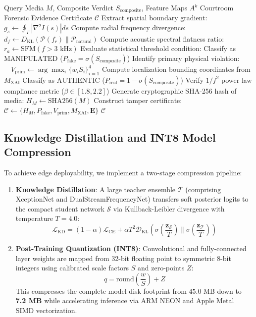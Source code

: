 \documentclass[journal]{IEEEtran}
\begin{document}
\begin{algorithm}[!t]
\caption{Explainable Evidence Attribution and Forensic Proof Generation}
\label{alg:evidence_proof}
\begin{algorithmic}[1]
\REQUIRE Query Media $M$, Composite Verdict $S_{\text{composite}}$, Feature Maps $A^k$
\ENSURE Courtroom Forensic Evidence Certificate $\mathcal{C}$
\STATE Extract spatial boundary gradient: $g_s \leftarrow \oint_\Gamma |\nabla^2 I(s)| ds$
\STATE Compute radial frequency divergence: $d_f \leftarrow D_{\text{KL}}(\mathcal{P}(f_r) \parallel \mathcal{P}_{\text{natural}})$
\STATE Compute acoustic spectral flatness ratio: $r_a \leftarrow \text{SFM}(f > 3\text{ kHz})$
\STATE Evaluate statistical threshold condition:
    \STATE Classify as $\text{MANIPULATED}$ ($P_{\text{fake}} = \sigma(S_{\text{composite}})$)
    \STATE Identify primary physical violation:
    \STATE $\quad V_{\text{prim}} \leftarrow \arg\max_{i} \{w_i S_i\}_{i=1}^4$
    \STATE Compute localization bounding coordinates from $M_{\text{XAI}}$
\ELSE
    \STATE Classify as $\text{AUTHENTIC}$ ($P_{\text{real}} = 1 - \sigma(S_{\text{composite}})$)
    \STATE Verify $1/f^2$ power law compliance metric ($\beta \in [1.8, 2.2]$)
\ENDIF
\STATE Generate cryptographic SHA-256 hash of media: $H_M \leftarrow \text{SHA256}(M)$
\STATE Construct tamper certificate: $\mathcal{C} \leftarrow \{H_M, P_{\text{fake}}, V_{\text{prim}}, M_{\text{XAI}}, \mathbf{E}\}$
\RETURN $\mathcal{C}$
\end{algorithmic}
\end{algorithm}

\subsection{Knowledge Distillation and INT8 Model Compression}
To achieve edge deployability, we implement a two-stage compression pipeline:
\begin{enumerate}
    \item \textbf{Knowledge Distillation}: A large teacher ensemble $\mathcal{T}$ (comprising XceptionNet and DualStreamFrequencyNet) transfers soft posterior logits to the compact student network $\mathcal{S}$ via Kullback-Leibler divergence with temperature $T = 4.0$:
    \begin{equation}
    \mathcal{L}_{\text{KD}} = (1 - \alpha) \mathcal{L}_{\text{CE}} + \alpha T^2 \mathcal{D}_{\text{KL}}\left( \sigma\left(\frac{\mathbf{z}_\mathcal{S}}{T}\right) \parallel \sigma\left(\frac{\mathbf{z}_\mathcal{T}}{T}\right) \right)
    \end{equation}
    \item \textbf{Post-Training Quantization (INT8)}: Convolutional and fully-connected layer weights are mapped from 32-bit floating point to symmetric 8-bit integers using calibrated scale factors $S$ and zero-points $Z$:
    \begin{equation}
    q = \text{round}\left( \frac{w}{S} \right) + Z
    \end{equation}
    This compresses the complete model disk footprint from $45.0\text{ MB}$ down to \textbf{7.2 MB} while accelerating inference via ARM NEON and Apple Metal SIMD vectorization.
\end{enumerate}
\end{document}
